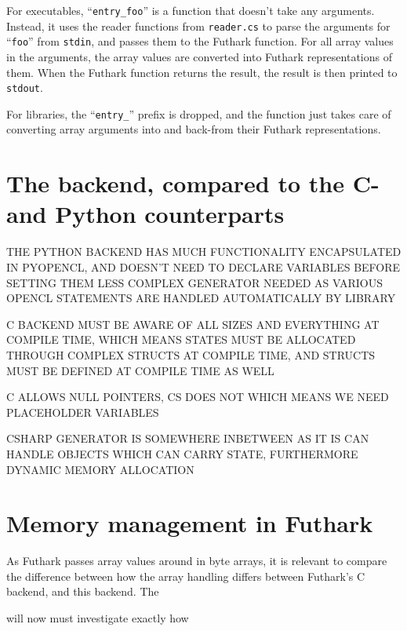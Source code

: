 For executables, ``\texttt{entry\_foo}'' is a function that doesn't take any
arguments. Instead, it uses the reader functions from \texttt{reader.cs} to parse the
arguments for ``\texttt{foo}'' from \texttt{stdin}, and passes them to the
Futhark function. For all array values in the arguments, the array values are
converted into Futhark representations of them.
When the Futhark function returns the result, the result is then printed to \texttt{stdout}.

For libraries, the ``\texttt{entry\_}'' prefix is dropped, and the function
just takes care of converting array arguments into and back-from their Futhark
representations.

\clearpage

\section{The \csharp{} backend, compared to the C- and Python counterparts}

THE PYTHON BACKEND HAS MUCH FUNCTIONALITY ENCAPSULATED IN PYOPENCL, AND DOESN'T
NEED TO DECLARE VARIABLES BEFORE SETTING THEM
LESS COMPLEX GENERATOR NEEDED AS VARIOUS OPENCL STATEMENTS ARE HANDLED
AUTOMATICALLY BY LIBRARY

C BACKEND MUST BE AWARE OF ALL SIZES AND EVERYTHING AT COMPILE TIME, WHICH MEANS
STATES MUST BE ALLOCATED THROUGH COMPLEX STRUCTS AT COMPILE TIME, AND STRUCTS
MUST BE DEFINED AT COMPILE TIME AS WELL

C ALLOWS NULL POINTERS, CS DOES NOT WHICH MEANS WE NEED PLACEHOLDER VARIABLES

CSHARP GENERATOR IS SOMEWHERE INBETWEEN AS IT IS CAN HANDLE OBJECTS WHICH CAN
CARRY STATE, FURTHERMORE DYNAMIC MEMORY ALLOCATION

\section{Memory management in Futhark \csharp{}}
As Futhark passes array values around in byte arrays, it is relevant to compare
the difference between how the array handling differs between Futhark's C
backend, and this \csharp{} backend.
The 


will now 
must investigate exactly how 



